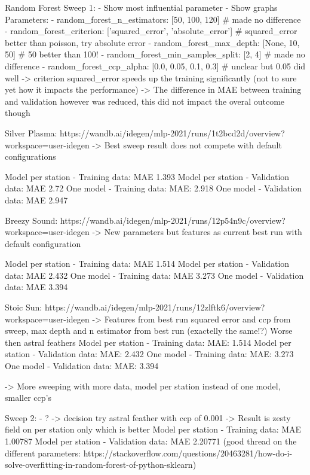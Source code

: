 \documentclass[a4paper]{article}
\begin{document}
    Random Forest Sweep 1:
    - Show most influential parameter
    - Show graphs
    Parameters:
    - random\_forest\_n\_estimators:  [50, 100, 120] \# made no difference
    - random\_forest\_criterion: ['squared\_error', 'absolute\_error']  \# squared\_error better than poisson, try absolute error
    - random\_forest\_max\_depth: [None, 10, 50]  \# 50 better than 100!
    - random\_forest\_min\_samples\_split: [2, 4] \# made no difference
    - random\_forest\_ccp\_alpha: [0.0, 0.05, 0.1, 0.3]  \# unclear but 0.05 did well
    -> criterion squared\_error speeds up the training significantly (not to sure yet how it impacts the performance)
    -> The difference in MAE between training and validation however was reduced, this did not impact the overal outcome though

    Silver Plasma: https://wandb.ai/idegen/mlp-2021/runs/1t2bcd2d/overview?workspace=user-idegen
    -> Best sweep result does not compete with default configurations

    Model per station - Training data: MAE 1.393
    Model per station - Validation data: MAE 2.72
    One model - Training data: MAE: 2.918
    One model - Validation data: MAE 2.947

    Breezy Sound: https://wandb.ai/idegen/mlp-2021/runs/12p54n9c/overview?workspace=user-idegen
    -> New parameters but features as current best run with default configuration

    Model per station - Training data: MAE 1.514
    Model per station - Validation data: MAE 2.432
    One model - Training data: MAE 3.273
    One model - Validation data: MAE 3.394

    Stoic Sun: https://wandb.ai/idegen/mlp-2021/runs/12zlftk6/overview?workspace=user-idegen
    -> Features from best run squared error and ccp from sweep, max depth and n estimator from best run (exactelly the same!?)
    Worse then astral feathers
    Model per station - Training data: MAE: 1.514
    Model per station - Validation data: MAE: 2.432
    One model - Training data: MAE: 3.273
    One model - Validation data: MAE: 3.394

    -> More sweeping with more data, model per station instead of one model, smaller ccp's

    Sweep 2:
    - ?
    -> decision try astral feather with ccp of 0.001
    -> Result is zesty field on per station only which is better
    Model per station - Training data: MAE 1.00787
    Model per station - Validation data: MAE 2.20771
    (good thread on the different parameters: https://stackoverflow.com/questions/20463281/how-do-i-solve-overfitting-in-random-forest-of-python-sklearn)
\end{document}
